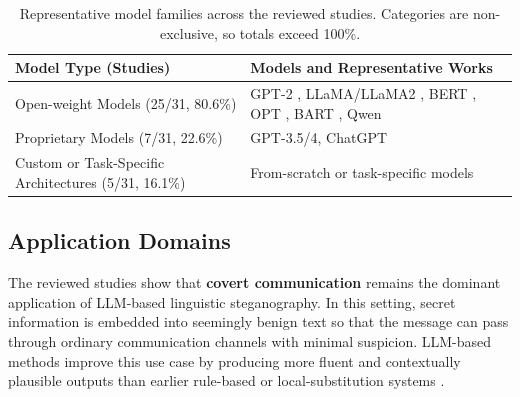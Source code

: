 \begin{table}[t]
  \centering
  \small
  \caption{Representative model families across the reviewed studies. Categories are non-exclusive, so totals exceed 100\%.}
  \label{tab:model_families}
  \begin{tabular}{|>{\raggedright\arraybackslash}p{4cm}|>{\raggedright\arraybackslash}p{9cm}|}
    \hline
    \textbf{Model Type (Studies)}                        & \textbf{Models and Representative Works}                          \\
    \hline
    Open-weight Models (25/31, 80.6\%)                   &
    GPT-2 \cite{ding2023discop,pang2024fremax,kaptchuk2021meteor,wang2023hi},
    LLaMA/LLaMA2 \cite{liao2024co,lin2024zero,qi2024provably,li2024semantic},
    BERT \cite{zheng2022general,zhang2024controllable,ding2023joint,ding2023context,ji2024principled,xiang2023cpg,zhang2020linguistic,qiang2023natural,yi2022alisa},
    OPT \cite{munyer2024deeptextmark},
    BART \cite{qiang2023natural,li2023rewriting},
    Qwen \cite{li2024imperceptible,shi2025emotionally}                                                                     \\
    Proprietary Models (7/31, 22.6\%)                    &
    GPT-3.5/4, ChatGPT
    \cite{xu2024beyond,steinebach2024natural,wu2024generative,hao2025robust,kuznetsov2025deepstego,wozniak2025multicriteria} \\
    Custom or Task-Specific Architectures (5/31, 16.1\%) &
    From-scratch or task-specific models
    \cite{yang2020vae,ding2023joint,ji2024principled,munyer2024deeptextmark,chen2025activetwo}                              \\
    \hline
  \end{tabular}
\end{table}

\subsection{Application Domains}
\label{sec:related-rq2}

The reviewed studies show that \textbf{covert communication} remains the dominant application of LLM-based linguistic steganography. In this setting, secret information is embedded into seemingly benign text so that the message can pass through ordinary communication channels with minimal suspicion. LLM-based methods improve this use case by producing more fluent and contextually plausible outputs than earlier rule-based or local-substitution systems \cite{yang2020vae,kaptchuk2021meteor,wu2024generative}.

